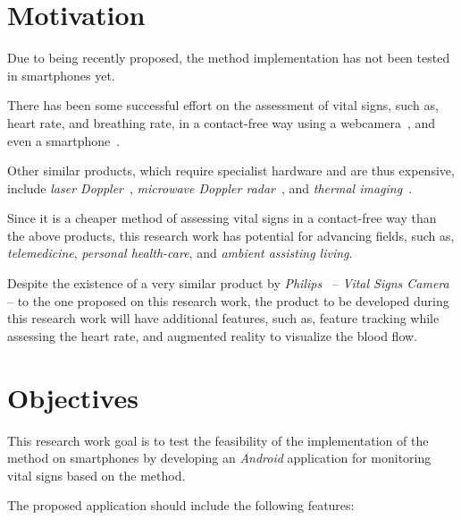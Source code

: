 \section{Motivation} \label{sec:intro:motivation}


Due to being recently proposed, the \evm{} method implementation
has not been tested in smartphones yet.

There has been some successful effort on the assessment of vital
signs, such as, heart rate, and breathing rate, in a contact-free
way using a webcamera~\cite{Wu2012Eulerian, Poh2010Non, Poh2011Advancements},
and even a smartphone~\cite{Philips2013}.

Other similar products, which require specialist hardware and are
thus expensive, include \emph{laser Doppler}~\cite{Ulyanov1993Pulse},
\emph{microwave Doppler radar}~\cite{Greneker1997Radar}, and
\emph{thermal imaging}~\cite{Garbey2007Contact}.

Since it is a cheaper method of assessing vital signs in a
contact-free way than the above products, this research work has
potential for advancing fields, such as, \emph{telemedicine},
\emph{personal health-care}, and \emph{ambient assisting living}.

Despite the existence of a very similar product by
\emph{Philips}~\cite{Philips2013} -- \emph{Vital Signs Camera} --
to the one proposed on this research work, the product to be developed
during this research work will have additional features, such as,
feature tracking while assessing the heart rate, and augmented reality
to visualize the blood flow.

\section{Objectives} \label{sec:intro:objectives}


This research work goal is to test the feasibility of the
implementation of the \evm{} method on smartphones by developing
an \emph{Android} application for monitoring vital signs based on
the \evm{} method.

The proposed application should include the following features:


